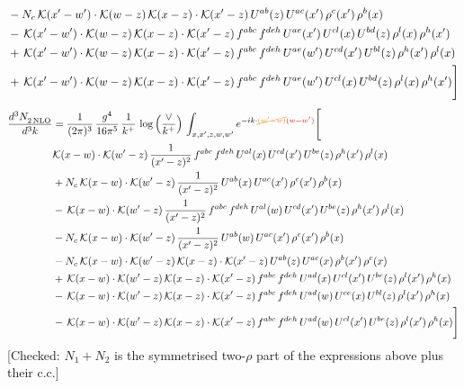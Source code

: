 \documentclass[9pt]{article}
\numberwithin{equation}{section}
\begin{document}
\begin{align}
&-N_{c}\,\mathcal{K}(x'-w')\cdot\mathcal{K}(w-z)\,\mathcal{K}(x-z)\cdot\mathcal{K}(x'-z)\,U^{ab}(z)\,U^{ac}(x')\,\rho^{c}(x')\,\rho^{b}(x)\notag\\
&-\,\mathcal{K}(x'-w')\cdot\mathcal{K}(w-z)\,\mathcal{K}(x-z)\cdot\mathcal{K}(x'-z)\,f^{abc}\,f^{deh}\,U^{ae}(x')\,U^{cl}(x)\,U^{bd}(z)\,\rho^{l}(x)\,\rho^{h}(x')\notag\\
&+\,\mathcal{K}(x'-w')\cdot\mathcal{K}(w-z)\,\mathcal{K}(x-z)\cdot\mathcal{K}(x'-z)\,f^{abc}\,f^{deh}\,U^{ae}(w')\,U^{cd}(x')\,U^{bl}(z)\,\rho^{h}(x')\,\rho^{l}(x)\notag\\
&+\,\mathcal{K}(x'-w')\cdot\mathcal{K}(w-z)\,\mathcal{K}(x-z)\cdot\mathcal{K}(x'-z)\,f^{abc}\,f^{deh}\,U^{ae}(w')\,U^{cl}(x)\,U^{bd}(z)\,\rho^{l}(x)\,\rho^{h}(x')\Bigg]
\end{align}
\begin{align}
\frac{d^{3}N_{2\,\rm NLO}^{\rm}}{d^{3}k}  & = \frac{1}{(2\pi)^{3}}\,\frac{g^{4}}{16\pi^{5}}\,\frac{1}{k^{+}}\,\log{\left(\frac{\vee}{k^{+}}\right)}\, \int_{x,x',z,w,w'}e^{-ik\cdot{\color{orange}\cancel{(w'-w)}}{\color{red}(w-w')}}\Bigg[\notag\\ & \mathcal{K}(x-w)\cdot\mathcal{K}(w'-z)\,\frac{1}{(x'-z)^{2}}\,f^{abc}\,f^{deh}\,U^{al}(x)\,U^{cd}(x')\,U^{be}(z)\,\rho^{h}(x')\,\rho^{l}(x)\notag\\
&+N_{c}\,\mathcal{K}(x-w)\cdot\mathcal{K}(w'-z)\,\frac{1}{(x'-z)^{2}}\,U^{ab}(x)\,U^{ac}(x')\,\rho^{c}(x')\,\rho^{b}(x)\notag\\
&-\,\mathcal{K}(x-w)\cdot\mathcal{K}(w'-z)\,\frac{1}{(x'-z)^{2}}\,f^{abc}\,f^{deh}\,U^{al}(w)\,U^{cd}(x')\,U^{be}(z)\,\rho^{h}(x')\,\rho^{l}(x)\notag\\
&-N_{c}\,\mathcal{K}(x-w)\cdot\mathcal{K}(w'-z)\,\frac{1}{(x'-z)^{2}}\,U^{ab}(w)\,U^{ac}(x')\,\rho^{c}(x')\,\rho^{b}(x)\notag\\
&-N_{c}\,\mathcal{K}(x-w)\cdot\mathcal{K}(w'-z)\,\mathcal{K}(x-z)\cdot\mathcal{K}(x'-z)\,U^{ab}(z)\,U^{ac}(x)\,\rho^{b}(x')\,\rho^{c}(x)\notag\\
&+\,\mathcal{K}(x-w)\cdot\mathcal{K}(w'-z)\,\mathcal{K}(x-z)\cdot\mathcal{K}(x'-z)\,f^{abc}\,f^{deh}\,U^{ad}(x)\,U^{cl}(x')\,U^{be}(z)\,\rho^{l}(x')\,\rho^{h}(x)\notag\\
&-\,\mathcal{K}(x-w)\cdot\mathcal{K}(w'-z)\,\mathcal{K}(x-z)\cdot\mathcal{K}(x'-z)\,f^{abc}\,f^{deh}\,U^{ad}(w)\,U^{ce}(x)\,U^{bl}(z)\,\rho^{l}(x')\,\rho^{h}(x)\notag\\
&-\,\mathcal{K}(x-w)\cdot\mathcal{K}(w'-z)\,\mathcal{K}(x-z)\cdot\mathcal{K}(x'-z)\,f^{abc}\,f^{deh}\,U^{ad}(w)\,U^{cl}(x')\,U^{be}(z)\,\rho^{l}(x')\,\rho^{h}(x)\Bigg]
\end{align} {\color{red}[Checked: $N_{1}+N_{2}$ is the symmetrised two-$\rho$ part of the expressions above plus their c.c.]}\par\noindent 
\end{document}
